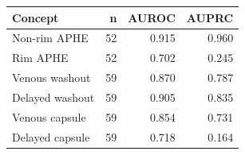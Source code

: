 \begin{tabular}{lrrr}
\toprule
Concept & n & AUROC & AUPRC \\
\midrule
Non-rim APHE & 52 & 0.915 & 0.960 \\
Rim APHE & 52 & 0.702 & 0.245 \\
Venous washout & 59 & 0.870 & 0.787 \\
Delayed washout & 59 & 0.905 & 0.835 \\
Venous capsule & 59 & 0.854 & 0.731 \\
Delayed capsule & 59 & 0.718 & 0.164 \\
\bottomrule
\end{tabular}
